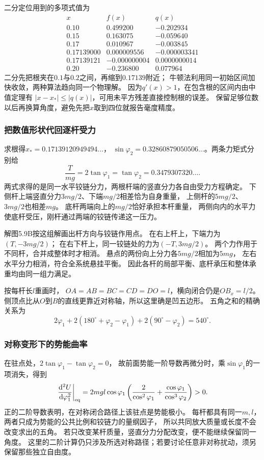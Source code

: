 \documentclass[UTF8,fontset=fandol,a4paper,11pt]{ctexart}
\newcommand{\dd}{\mathop{}\!\mathrm{d}}
\begin{document}
二分定位用到的多项式值为
\[
\begin{array}{c|r|r}
x&f(x)&q(x)\\ \hline
0.10&0.499200&-0.202934\\
0.15&0.163075&-0.059640\\
0.17&0.010967&-0.003845\\
0.17139000&0.000009556&-0.000003341\\
0.17139121&-0.000000004&0.0000000014\\
0.20&-0.236800&0.077964
\end{array}
\]
二分先把根夹在$0.1$与$0.2$之间，再缩到$0.17139$附近；
牛顿法利用同一初始区间加快收敛，两种算法趋向同一个物理解。
因为$q'(x)>1$，在包含根的区间内由中值定理有
$|x-x_*|\leq|q(x)|$，可用未平方残差直接控制根的误差。
保留足够位数以后再换算角度，避免先把$x$取到四位就报告毫度精度。

\subsubsection*{把数值形状代回逐杆受力}
求根得$x_*=0.17139120949494\ldots$，
$\sin\varphi_2=0.32860879050506\ldots$。两条力矩式分别给
\[
\frac{T}{mg}=2\tan\varphi_1
=\tan\varphi_2=0.3479307320\ldots.
\]
两式求得的是同一水平铰链分力，两根杆端的竖直分力各自由受力方程确定。
下侧杆上端竖直分力$3mg/2$、下端$mg/2$相差恰为自身重量，
上侧杆的$5mg/2$、$3mg/2$也相差$mg$。
底杆两端向上的$mg/2$恰好承担本杆重量，
两侧向内的水平力使底杆受压，刚杆通过两端的铰链传递这一压力。

解图5.9B按这组解画出杆方向与铰链作用点。
在右上杆上，下端力为$(T,-3mg/2)$；
在右下杆上，同一铰链处的力为$(-T,3mg/2)$。
两个力作用于不同杆，合并成整体时才相消。
悬点的两份向上分力各$5mg/2$相加为$5mg$，
左右水平分力相消，符合全系统悬挂平衡。
因此各杆的局部平衡、底杆承压和整体承重均由同一组力满足。

按每杆长$l$重画时，
$OA=AB=BC=CD=DO=l$，横向闭合仍是$OB_x=l/2$。
侧顶点比从$O$到$B$的直线更靠近对称轴，所以这里确是凹五边形。
五角之和的精确关系为
\[
2\varphi_1+
2(180^\circ+\varphi_2-\varphi_1)+
2(90^\circ-\varphi_2)=540^\circ.
\]


\subsubsection*{对称变形下的势能曲率}
在驻点处，$2\tan\varphi_1-\tan\varphi_2=0$，
故前面势能一阶导数再微分时，乘$\sin\varphi_1$的一项消失，得到
\[
\left.\frac{\dd^2U}{\dd\varphi_1^2}\right|_{\rm eq}
=2mgl\cos\varphi_1
\left(\frac{2}{\cos^2\varphi_1}
+\frac{\cos\varphi_1}{\cos^3\varphi_2}\right)>0.
\]
正的二阶导数表明，在对称闭合路径上该驻点是势能极小。
每杆都具有同一$m,l$，两者只成为势能的公共比例和铰链力的量纲因子，
所以共同放大质量或长度不会改变求出的五角。
若只改变某杆质量，竖直分力分配改变，便不能继续保留同一角度。
这里的二阶计算仍只涉及所选对称路径；若要讨论任意非对称扰动，须另保留那些独立自由度。
\end{document}
